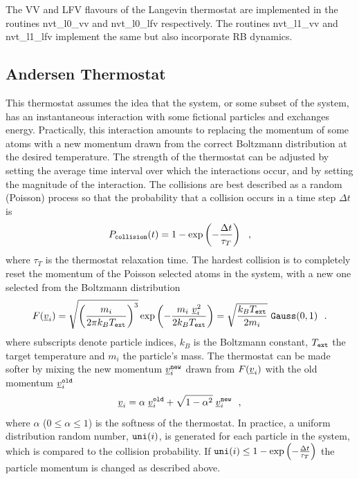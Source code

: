 The VV and LFV flavours of the Langevin thermostat are implemented in
the \D routines {\sc nvt\_l0\_vv} and {\sc nvt\_l0\_lfv} respectively.
The routines {\sc nvt\_l1\_vv} and {\sc nvt\_l1\_lfv} implement the
same but also incorporate RB dynamics.

\subsection{Andersen Thermostat}

This thermostat assumes the idea that the system, or some subset of
the system, has an instantaneous interaction with some fictional
particles and exchanges energy.  Practically, this interaction
amounts to replacing the momentum of some atoms with a new momentum
drawn from the correct Boltzmann distribution at the desired
temperature.  The strength of the thermostat can be adjusted by
setting the average time interval over which the interactions
occur, and by setting the magnitude of the interaction.  The
collisions are best described as a random (Poisson) process so that
the probability that a collision occurs
in a time step $\Delta t$ is
\begin{equation}
P_{\tt collision}(t) = 1 - \exp \left(-\frac{\Delta t}{\tau_{T}}\right)~~,
\end{equation}
where $\tau_{T}$ is the thermostat relaxation time.  The hardest
collision is to completely reset the momentum of the Poisson
selected atoms in the system, with a new one selected from the
Boltzmann distribution
\begin{equation}
F(\mbox{$\underline{v}$}_{i}) = \sqrt{\left(\frac{m_{i}}{2 \pi k_{B}T_{\tt ext}}\right)^{3}}
\exp \left(-\frac{m_{i}~\mbox{$\underline{v}$}_{i}^{2}}{2 k_{B}T_{\tt ext}}\right) =
\sqrt{\frac{k_{B}T_{\tt ext}}{2 m_{i}}}~{\tt Gauss}(0,1)~~.
\end{equation}
where subscripts denote particle indices, $k_{B}$ is the Boltzmann
constant, $T_{\tt ext}$ the target temperature and $m_{i}$ the particle's mass.
The thermostat can be made softer by mixing the new momentum
$\mbox{$\underline{v}$}_{i}^{\tt new}$ drawn from $F(\mbox{$\underline{v}$}_{i})$ with the old
momentum $\mbox{$\underline{v}$}_{i}^{\tt old}$
\begin{equation}
\mbox{$\underline{v}$}_{i} = \alpha \; \mbox{$\underline{v}$}_{i}^{\tt old} +
\sqrt{1-\alpha^{2}} \; \mbox{$\underline{v}$}_{i}^{\tt new}~~,
\end{equation}
where $\alpha$ ($0 \le \alpha \le 1$) is the softness of the
thermostat.  In practice, a uniform distribution random number,
${\tt uni}(i)$, is generated for each particle in the system,
which is compared to the collision probability.  If
${\tt uni}(i) \le 1 - \exp \left(-\frac{\Delta t}{\tau_{T}}\right)$
the particle momentum is changed as described above.

